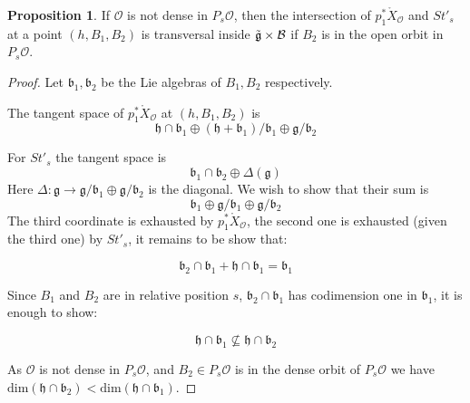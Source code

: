 \documentclass[12pt]{article}
\newcommand{\B}{\mathcal{B}}
\newcommand{\s}{\mathcal{O}}
\theoremstyle{plain}
\theoremstyle{definition}
\newtheorem{prop}[theorem]{Proposition}
\begin{document}
\begin{prop}\label{transversal_claim}
    If $\mathcal{O}$ is not dense in $P_{s} \mathcal{O}$, then 
    the intersection of $p_{1}^*\mathring{X}_{\mathcal{O}}$ and $St'_{s}$ at a point $(h,B_1,B_2)$ is transversal inside $\Tilde{\mathfrak{g}}\times \B$ if $B_2$ is in the open orbit in $P_s\s$. 

    
\end{prop}
\begin{proof}
    Let $\mathfrak{b}_1,\mathfrak{b}_2$ be the Lie algebras of $B_1,B_2$ respectively.

     The tangent space of $p_1^*\mathring{X}_{\mathcal{O}}$ at $(h,B_1,B_2)$ is $$\mathfrak{h}\cap \mathfrak{b_{1}}\oplus (\mathfrak{h}+\mathfrak{b_{1}})/\mathfrak{b_{1}}\oplus \mathfrak{g}/\mathfrak{b_{2}}$$
    
    For $St'_{s}$ the tangent space is 
    $$\mathfrak{b}_{1} \cap \mathfrak{b}_{2} \oplus \Delta(\mathfrak{g}) $$
    Here $\Delta:\mathfrak{g}\rightarrow \mathfrak{g}/\mathfrak{b}_{1} \oplus \mathfrak{g}/\mathfrak{b}_{2}$ is the diagonal.
    We wish to show that their sum is $$\mathfrak{b}_{1}\oplus \mathfrak{g}/\mathfrak{b}_{1} \oplus \mathfrak{g}/\mathfrak{b}_{2}$$
    The third coordinate is exhausted by $p_1^*\mathring{X}_{\mathcal{O}}$, the second one is exhausted (given the third one) by $St'_{s}$, it remains to be show that:

    $$ \mathfrak{b}_{2}\cap \mathfrak{b}_{1} + \mathfrak{h} \cap \mathfrak{b}_{1}=\mathfrak{b}_{1} $$

    Since $B_{1}$ and $B_{2}$ are in relative position $s$, $\mathfrak{b}_{2}\cap \mathfrak{b}_{1}$ has codimension one in $\mathfrak{b}_{1}$, it is enough to show:

    $$ \mathfrak{h} \cap \mathfrak{b}_{1} \nsubseteq \mathfrak{h} \cap\mathfrak{b}_{2}$$

    As $\mathcal{O}$ is not dense in $P_{s}\mathcal{O}$, and $B_{2}\in P_{s}\mathcal{O}$ is in the dense orbit of $P_s\mathcal{O}$ we have $\mathrm{dim}(\mathfrak{h} \cap \mathfrak{b}_{2}) < \mathrm{dim}(\mathfrak{h} \cap \mathfrak{b}_{1})$.

    
\end{proof}
\end{document}
